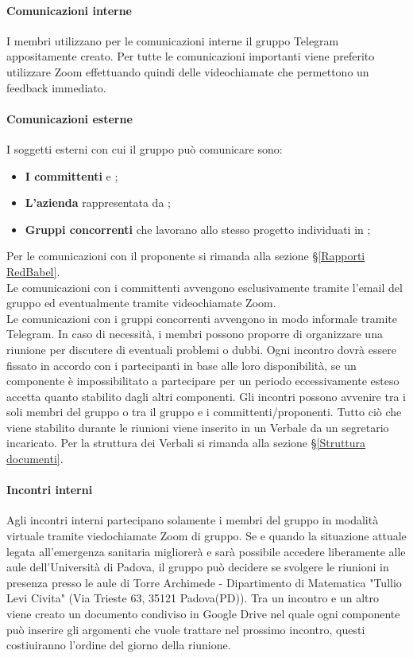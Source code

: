 \paragraph*{Comunicazioni interne}
I membri utilizzano per le comunicazioni interne il gruppo Telegram appositamente creato. Per tutte le comunicazioni importanti viene preferito utilizzare Zoom effettuando quindi delle videochiamate che permettono un feedback immediato.
\paragraph*{Comunicazioni esterne}
I soggetti esterni con cui il gruppo può comunicare sono: 
\begin{itemize}
	\item \textbf{I committenti} \VT e \CR;
	\item \textbf{L'azienda \Proponente} rappresentata da ;
	\item \textbf{Gruppi concorrenti} che lavorano allo stesso progetto \NomeProgetto individuati in ;
\end{itemize}
Per le comunicazioni con il proponente si rimanda alla sezione \S\ref{Rapporti RedBabel}. \\
Le comunicazioni con i committenti avvengono esclusivamente tramite l'email del gruppo \textbf{\Mail}  ed eventualmente tramite videochiamate Zoom.\\
Le comunicazioni con i gruppi concorrenti avvengono in modo informale tramite Telegram.
In caso di necessità, i membri possono proporre di organizzare una riunione per discutere di eventuali problemi o dubbi. Ogni incontro dovrà essere fissato in accordo con i partecipanti in base alle loro disponibilità, se un componente è impossibilitato a partecipare per un periodo eccessivamente esteso accetta quanto stabilito dagli altri componenti. Gli incontri possono avvenire tra i soli membri del gruppo o tra il gruppo e i committenti/proponenti. 
Tutto ciò che viene stabilito durante le riunioni viene inserito in un Verbale da un segretario incaricato. Per la struttura dei Verbali si rimanda alla sezione \S\ref{Struttura documenti}.
\paragraph*{Incontri interni}
Agli incontri interni partecipano solamente i membri del gruppo in modalità virtuale tramite viedochiamate Zoom di gruppo.
Se e quando la situazione attuale legata all'emergenza sanitaria migliorerà e sarà possibile accedere liberamente alle aule dell'Università di Padova, il gruppo può decidere se svolgere le riunioni in presenza presso le aule di Torre Archimede - Dipartimento di Matematica "Tullio Levi Civita" (Via Trieste 63, 35121 Padova(PD)).
Tra un incontro e un altro viene creato un documento condiviso in Google Drive nel quale ogni componente può inserire gli argomenti che vuole trattare nel prossimo incontro, questi costiuiranno l'ordine del giorno della riunione.
